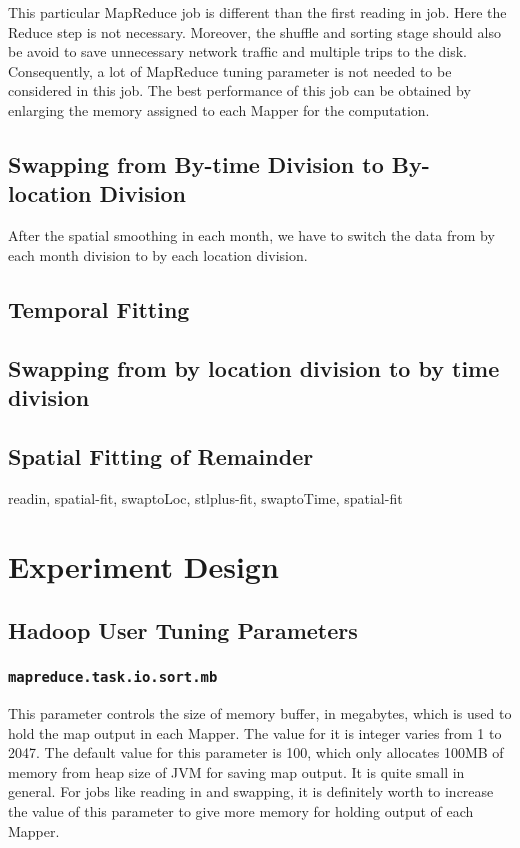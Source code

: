 This particular MapReduce job is different than the first reading in job. Here
the Reduce step is not necessary. Moreover, the shuffle and sorting stage should
also be avoid to save unnecessary network traffic and multiple trips to the disk.
Consequently, a lot of MapReduce tuning parameter is not needed to be considered
in this job. The best performance of this job can be obtained by enlarging the 
memory assigned to each Mapper for the computation.

\subsection{Swapping from By-time Division to By-location Division}

After the spatial smoothing in each month, we have to switch the data from by 
each month division to by each location division. 



\subsection{Temporal Fitting}

\subsection{Swapping from by location division to by time division}

\subsection{Spatial Fitting of Remainder}

readin, spatial-fit, swaptoLoc, stlplus-fit, swaptoTime, spatial-fit



\section{Experiment Design}

\subsection{Hadoop User Tuning Parameters}

\subsubsection{\texttt{mapreduce.task.io.sort.mb}}

This parameter controls the size of memory buffer, in megabytes, which is used 
to hold the map output in each Mapper. The value for it is integer varies from 1 
to 2047. The default value for this parameter is 100, which only allocates 100MB
of memory from heap size of JVM for saving map output. It is quite small in 
general. For jobs like reading in and swapping, it is definitely worth to increase
the value of this parameter to give more memory for holding output of each Mapper.


